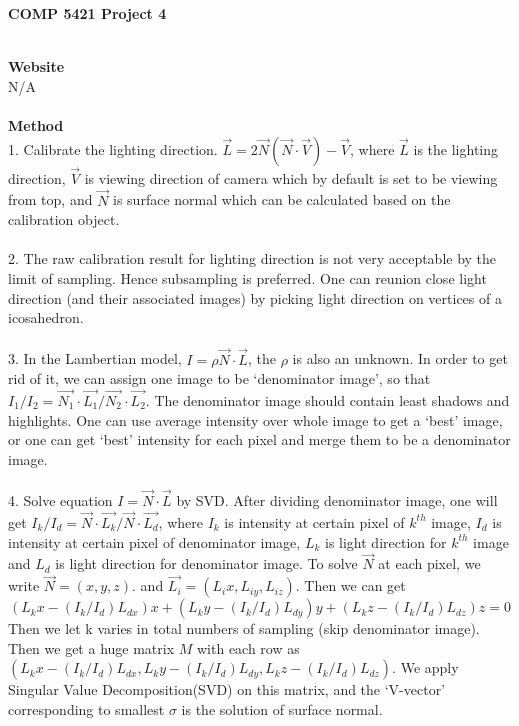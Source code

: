 \documentclass [12pt] {article}
\begin{document}
\begin{spacing}{1.5}
\noindent

\begin {flushright}
\textbf{COMP 5421 Project 4}\\
\end {flushright}
~\\
\noindent
\textbf{Website}\\ 
N/A\\
~\\
\textbf{Method}\\
1. Calibrate the lighting direction. $\vec{L} = 2\vec{N}(\vec{N}\cdot \vec{V})-\vec{V}$, where $\vec{L}$ is the lighting direction, $\vec{V}$ is viewing direction of camera which by default is set to be viewing from top, and $\vec{N}$ is surface normal which can be calculated based on the calibration object.\\
~\\
2. The raw calibration result for lighting direction is not very acceptable by the limit of sampling. Hence subsampling is preferred. One can reunion close light direction (and their associated images) by picking light direction on vertices of a icosahedron.\\
~\\
3. In the Lambertian model, $I = \rho \vec{N} \cdot \vec{L}$, the $\rho$ is also an unknown. In order to get rid of it, we can assign one image to be `denominator image', so that $I_{1}/I_{2} = \vec{N_{1}} \cdot \vec{L_{1}}/ \vec{N_{2}} \cdot \vec{L_{2}}$. The denominator image should contain least shadows and highlights. One can use average intensity over whole image to get a `best' image, or one can get `best' intensity for each pixel and merge them to be a denominator image.\\
~\\
4. Solve equation $I = \vec{N} \cdot \vec{L}$ by SVD. After dividing denominator image, one will get $I_{k}/I_{d} = \vec{N} \cdot \vec{L_{k}}/ \vec{N} \cdot \vec{L_{d}}$, where $I_{k}$ is intensity at certain pixel of $k^{th}$ image, $I_{d}$ is intensity at certain pixel of denominator image, $L_{k}$ is light direction for $k^{th}$ image and $L_{d}$ is light direction for denominator image. To solve $\vec{N}$ at each pixel, we write $\vec{N} = (x, y, z)$. and $\vec{L_{i}} = (L{_ix}, L_{iy}, L_{iz})$. Then we can get $$(L{_kx}-(I_{k}/I_{d}) L_{dx})x+ (L{_ky}-(I_{k}/I_{d}) L_{dy})y+ (L{_kz}-(I_{k}/I_{d}) L_{dz})z = 0$$ Then we let k varies in total numbers of sampling (skip denominator image). Then we get a huge matrix $M$ with each row as $(L{_kx}-(I_{k}/I_{d}) L_{dx}, L{_ky}-(I_{k}/I_{d}) L_{dy}, L{_kz}-(I_{k}/I_{d}) L_{dz})$. We apply Singular Value Decomposition(SVD) on this matrix, and the `V-vector' corresponding to  smallest $\sigma$ is the solution of surface normal. \\

\end{spacing}
\end{document}
